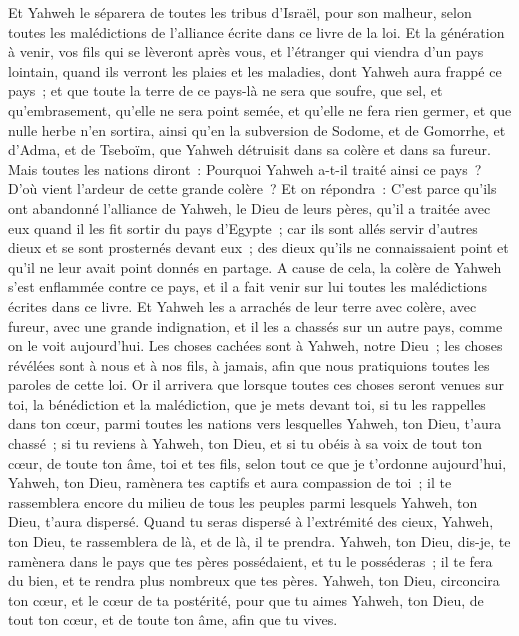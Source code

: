 \begin{multicols}{2}
Et Yahweh le séparera de toutes les tribus d'Israël, pour son malheur, selon toutes les malédictions de l'alliance écrite dans ce livre de la loi.
Et la génération à venir, vos fils qui se lèveront après vous, et l'étranger qui viendra d'un pays lointain, quand ils verront les plaies et les maladies, dont Yahweh aura frappé ce pays~;
et que toute la terre de ce pays-là ne sera que soufre, que sel, et qu'embrasement, qu'elle ne sera point semée, et qu'elle ne fera rien germer, et que nulle herbe n'en sortira, ainsi qu'en la subversion de Sodome, et de Gomorrhe, et d'Adma, et de Tseboïm, que Yahweh détruisit dans sa colère et dans sa fureur.
Mais toutes les nations diront~: Pourquoi Yahweh a-t-il traité ainsi ce pays~? D'où vient l'ardeur de cette grande colère~?
Et on répondra~: C'est parce qu'ils ont abandonné l'alliance de Yahweh, le Dieu de leurs pères, qu'il a traitée avec eux quand il les fit sortir du pays d'Egypte~;
car ils sont allés servir d'autres dieux et se sont prosternés devant eux~; des dieux qu'ils ne connaissaient point et qu'il ne leur avait point donnés en partage.
A cause de cela, la colère de Yahweh s'est enflammée contre ce pays, et il a fait venir sur lui toutes les malédictions écrites dans ce livre.
Et Yahweh les a arrachés de leur terre avec colère, avec fureur, avec une grande indignation, et il les a chassés sur un autre pays, comme on le voit aujourd'hui.
Les choses cachées sont à Yahweh, notre Dieu~; les choses révélées sont à nous et à nos fils, à jamais, afin que nous pratiquions toutes les paroles de cette loi.
\VerseOne{}Or il arrivera que lorsque toutes ces choses seront venues sur toi, la bénédiction et la malédiction, que je mets devant toi, si tu les rappelles dans ton cœur, parmi toutes les nations vers lesquelles Yahweh, ton Dieu, t'aura chassé~;
si tu reviens à Yahweh, ton Dieu, et si tu obéis à sa voix de tout ton cœur, de toute ton âme, toi et tes fils, selon tout ce que je t'ordonne aujourd'hui,
Yahweh, ton Dieu, ramènera tes captifs et aura compassion de toi~; il te rassemblera encore du milieu de tous les peuples parmi lesquels Yahweh, ton Dieu, t'aura dispersé.
Quand tu seras dispersé à l'extrémité des cieux, Yahweh, ton Dieu, te rassemblera de là, et de là, il te prendra.
Yahweh, ton Dieu, dis-je, te ramènera dans le pays que tes pères possédaient, et tu le posséderas~; il te fera du bien, et te rendra plus nombreux que tes pères.
Yahweh, ton Dieu, circoncira ton cœur, et le cœur de ta postérité, pour que tu aimes Yahweh, ton Dieu, de tout ton cœur, et de toute ton âme, afin que tu vives.

\end{multicols}
